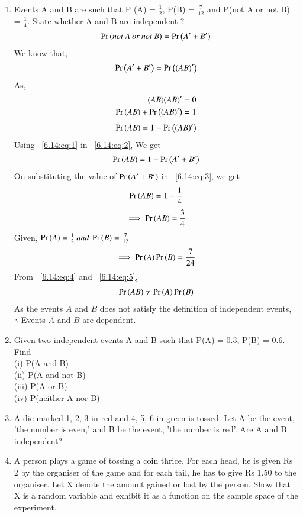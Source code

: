 \begin{enumerate}[label=\thesection.\arabic*.,ref=\thesection.\theenumi]
\item Events A and B are such that P (A) = $\frac{1}{2}$, P(B) = $\frac{7}{12}$ and P(not A or not B) = $\frac{1}{4}$. State whether A and B are independent ?\\
\solution
\begin{align}
\Pr\left(not\: A \:or\: not\: B\right) = \Pr\left(A' + B'\right) 
\end{align}
We know that,\\
\begin{align} \label{6.14:eq:1}
 \Pr\left(A' + B'\right) = \Pr\left((AB)'\right)
\end{align}
As,\\
\begin{align}
(AB)(AB)' = 0 \\
\Pr\left(AB\right) + \Pr\left((AB)'\right) = 1
\end{align}
\begin{align} \label{6.14:eq:2}
\Pr\left(AB\right) = 1- \Pr\left((AB)'\right)
\end{align}
Using ~\ref{6.14:eq:1} in ~\ref{6.14:eq:2}, We get
\begin{align} \label{6.14:eq:3}
\Pr\left(AB\right) = 1- \Pr\left(A' + B'\right)
\end{align}
On substituting the value of $\Pr\left(A' + B'\right)$ in ~\ref{6.14:eq:3}, we get
\begin{align}
\Pr\left(AB\right) = 1- \frac{1}{4}
\end{align}
\begin{align} \label{6.14:eq:4}
 \implies \Pr\left(AB\right) = \frac{3}{4}
\end{align}
Given,
$\Pr\left(A\right) = \frac{1}{2} \:and \:\Pr\left(B\right) = \frac{7}{12}$
\begin{align} \label{6.14:eq:5}
\implies \Pr\left(A\right)\Pr\left(B\right) = \frac{7}{24}
\end{align}
From ~\ref{6.14:eq:4} and ~\ref{6.14:eq:5},
\begin{align}
 \Pr\left(AB\right)\neq \Pr\left(A\right)\Pr\left(B\right)
\end{align}
As the events $A$ and $B$ does not satisfy the definition of independent events,
$\therefore$ Events $A$ and $B$ are dependent.
%
\item Given two independent events A and B such that P(A) = 0.3, P(B) = 0.6. Find\\
(i) P(A and B)\\
(ii) P(A and not B)\\
(iii) P(A or B)\\
(iv) P(neither A nor B)\\
%
\solution

\item A die marked 1, 2, 3 in red and 4, 5, 6 in green is tossed. Let A be the event, 'the number is even,' and B be the event, 'the number is red'. Are A and B
independent?\\
\item A person plays a game of tossing a coin thrice. For each head, he is given Rs 2 by the organiser of the game and for each tail, he has to give Rs 1.50 to the organiser. Let X denote the amount gained or lost by the person. Show that X is a random variable and exhibit it as a function on the sample space of the experiment.\\
\solution



\end{enumerate}
